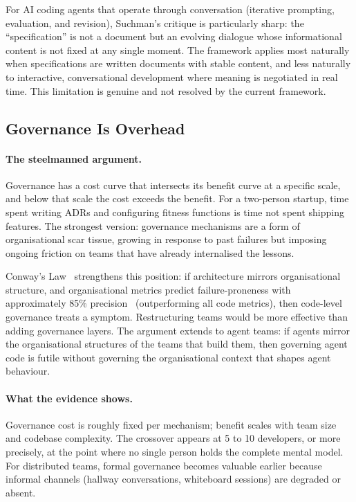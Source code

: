 For AI coding agents that operate through conversation (iterative prompting,
evaluation, and revision), Suchman's critique is particularly sharp: the
``specification'' is not a document but an evolving dialogue whose informational
content is not fixed at any single moment.  The framework applies most naturally
when specifications are written documents with stable content, and less
naturally to interactive, conversational development where meaning is negotiated
in real time.  This limitation is genuine and not resolved by the current
framework.


\subsection{Governance Is Overhead}
\label{sec:contrarian-overhead}

\paragraph{The steelmanned argument.}
Governance has a cost curve that intersects its benefit curve at a specific
scale, and below that scale the cost exceeds the benefit.  For a two-person
startup, time spent writing ADRs and configuring fitness functions is time not
spent shipping features.  The strongest version: governance mechanisms are a
form of organisational scar tissue, growing in response to past failures but
imposing ongoing friction on teams that have already internalised the lessons.

Conway's Law~\citep{conway1968} strengthens this position: if architecture
mirrors organisational structure, and organisational metrics predict
failure-proneness with approximately 85\% precision~\citep{nagappan2008}
(outperforming all code metrics), then code-level governance treats a symptom.
Restructuring teams would be more effective than adding governance layers.  The
argument extends to agent teams: if agents mirror the organisational structures
of the teams that build them, then governing agent code is futile without
governing the organisational context that shapes agent behaviour.

\paragraph{What the evidence shows.}
Governance cost is roughly fixed per mechanism; benefit scales with team size
and codebase complexity.  The crossover appears at 5 to 10 developers, or more
precisely, at the point where no single person holds the complete mental model.
For distributed teams, formal governance becomes valuable earlier because
informal channels (hallway conversations, whiteboard sessions) are degraded or
absent.

